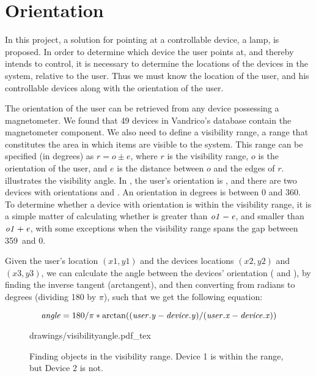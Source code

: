 \section{Orientation}\label{sec:analysis:orientation}
In this project, a solution for pointing at a controllable device, \eg a lamp, is proposed. 
In order to determine which device the user points at, 
and thereby intends to control, 
it is necessary to determine the locations of the devices in the system, 
relative to the user. 
Thus we must know the location of the user, 
and his controllable devices along with the orientation of the user.

The orientation of the user can be retrieved from any device possessing a magnetometer. 
We found that \num{49} devices in Vandrico's database contain the magnetometer component. 
We also need to define a visibility range, 
\ie a range that constitutes the area in which items are visible to the system. 
This range can be specified (in degrees) as $r = o \pm e$, 
where $r$ is the visibility range, $o$ is the orientation of the user, 
and $e$ is the distance between $o$ and the edges of $r$.
 illustrates the visibility angle. 
In , the user's orientation is , 
and there are two devices with orientations  and . 
An orientation in degrees is between \num{0} and \num{360}. 
To determine whether a device with orientation  is within the visibility range, 
it is a simple matter of calculating whether  is greater than $\var{o1}-\var{e}$, 
and smaller than $\var{o1}+\var{e}$, 
with some exceptions when the visibility range spans the gap between 359\degree \ and 0\degree.

Given the user's location $(x1, y1)$ and the devices locations $(x2, y2)$ and $(x3, y3)$,
we can calculate the angle between the devices' orientation ( and ), 
by finding the inverse tangent (arctangent), 
and then converting from radians to degrees (dividing \num{180} by $\pi$), 
such that we get the following equation:

\begin{equation}\label{eq:angle}
\var{angle} = 180 / \pi * \arctan((\var{user.y} - \var{device.y}) / (\var{user.x} - \var{device.x}))
\end{equation}

\begin{figure}[!htb]
    \centering
    \def\svgwidth{0.6\textwidth}
    {drawings/visibilityangle.pdf_tex}
    \caption{Finding objects in the visibility range. Device 1 is within the range, but Device 2 is not.}
\label{fig:visibilityangle}
\end{figure}

